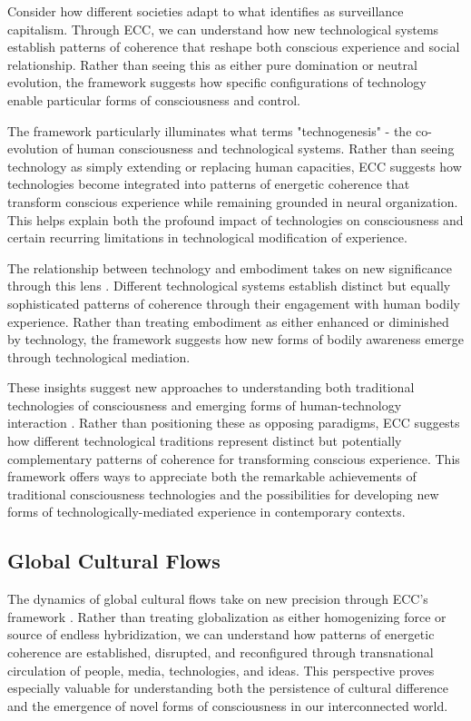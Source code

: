 \begin{refsection}
Consider how different societies adapt to what \cite{zuboff2019age} identifies as surveillance capitalism. Through ECC, we can understand how new technological systems establish patterns of coherence that reshape both conscious experience and social relationship. Rather than seeing this as either pure domination or neutral evolution, the framework suggests how specific configurations of technology enable particular forms of consciousness and control.

The framework particularly illuminates what \cite{hayles2012how} terms "technogenesis" - the co-evolution of human consciousness and technological systems. Rather than seeing technology as simply extending or replacing human capacities, ECC suggests how technologies become integrated into patterns of energetic coherence that transform conscious experience while remaining grounded in neural organization. This helps explain both the profound impact of technologies on consciousness and certain recurring limitations in technological modification of experience.

The relationship between technology and embodiment takes on new significance through this lens \cite{ihde2009postphenomenology}. Different technological systems establish distinct but equally sophisticated patterns of coherence through their engagement with human bodily experience. Rather than treating embodiment as either enhanced or diminished by technology, the framework suggests how new forms of bodily awareness emerge through technological mediation.

These insights suggest new approaches to understanding both traditional technologies of consciousness and emerging forms of human-technology interaction \cite{verbeek2005what}. Rather than positioning these as opposing paradigms, ECC suggests how different technological traditions represent distinct but potentially complementary patterns of coherence for transforming conscious experience. This framework offers ways to appreciate both the remarkable achievements of traditional consciousness technologies and the possibilities for developing new forms of technologically-mediated experience in contemporary contexts.

\subsection{Global Cultural Flows}

The dynamics of global cultural flows take on new precision through ECC's framework \cite{appadurai1996modernity}. Rather than treating globalization as either homogenizing force or source of endless hybridization, we can understand how patterns of energetic coherence are established, disrupted, and reconfigured through transnational circulation of people, media, technologies, and ideas. This perspective proves especially valuable for understanding both the persistence of cultural difference and the emergence of novel forms of consciousness in our interconnected world.


\end{refsection}

